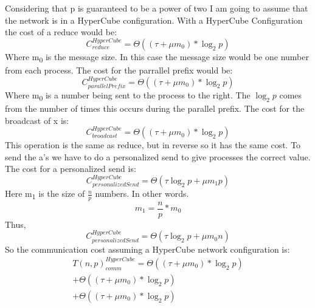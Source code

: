 \documentclass{article}
\begin{document}
\begin{enumerate}[i.]
            Considering that p is guaranteed to be a power of two I am going to assume that the network is in a HyperCube configuration.
            With a HyperCube Configuration the cost of a reduce would be:
            \begin{equation}
                C_{reduce}^{HyperCube} = \Theta((\tau + \mu m_{0})*\log_{2}p)
            \end{equation}
            Where m\textsubscript{0} is the message size. In this case the message size would be one number from each process. The cost for the parrallel prefix would be:
            \begin{equation}
                C_{parallelPrefix}^{HyperCube} = \Theta((\tau + \mu m_{0})*\log_{2}p)
            \end{equation}
            Where m\textsubscript{0} is a number being sent to the process to the right. The $\log_{2}p$ comes from the number of times this occurs during the parallel prefix.
            The cost for the broadcast of x is:
            \begin{equation}
                C_{broadcast}^{HyperCube} = \Theta((\tau + \mu m_{0})*\log_{2}p)
            \end{equation}
            This operation is the same as reduce, but in reverse so it has the same cost. To send the a's we have to do a personalized send to give processes the correct value. The cost for a personalized send is:
            \begin{equation}
                C_{personalizedSend}^{HyperCube} = \Theta(\tau \log_{2}{p} + \mu m_{1}{p})
            \end{equation}
            Here m\textsubscript{1} is the size of $\frac{n}{p}$ numbers. In other words.
            \begin{equation}
                m_{1} = \frac{n}{p}*m_{0}
            \end{equation}
            Thus,
            \begin{equation}
                C_{personalizedSend}^{HyperCube} = \Theta(\tau \log_{2}{p} + \mu m_{0}{n})
            \end{equation}
            So the communication cost assuming a HyperCube network configuration is:
            \begin{multline*}
                {T(n,p)}_{comm}^{HyperCube} = \Theta((\tau + \mu m_{0})*\log_{2}p) \\
                + \Theta((\tau + \mu m_{0})*\log_{2}p) \\
                + \Theta((\tau + \mu m_{0})*\log_{2}p) \\

\end{multline*}
\end{enumerate}
\end{document}
